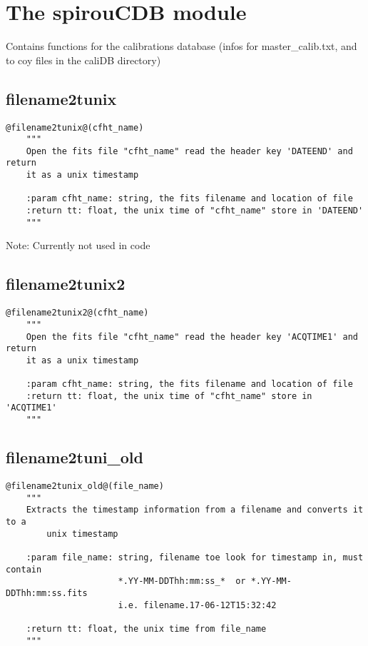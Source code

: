\clearpage
\newpage
\section{The spirouCDB module}

Contains functions for the calibrations database (infos for master\_calib.txt, and to coy files in the caliDB directory)

\subsection{filename2tunix}
\begin{lstlisting}[style=pythonstyle]
@filename2tunix@(cfht_name)
    """
    Open the fits file "cfht_name" read the header key 'DATEEND' and return
    it as a unix timestamp
    
    :param cfht_name: string, the fits filename and location of file
    :return tt: float, the unix time of "cfht_name" store in 'DATEEND' 
    """
\end{lstlisting}

\noindent Note: Currently not used in code \\

\subsection{filename2tunix2}
\begin{lstlisting}[style=pythonstyle]
@filename2tunix2@(cfht_name)
    """
    Open the fits file "cfht_name" read the header key 'ACQTIME1' and return
    it as a unix timestamp

    :param cfht_name: string, the fits filename and location of file
    :return tt: float, the unix time of "cfht_name" store in 'ACQTIME1'
    """
\end{lstlisting}

\vspace{0.5cm}
\subsection{filename2tuni\_old}
\begin{lstlisting}[style=pythonstyle]
@filename2tunix_old@(file_name)
    """
    Extracts the timestamp information from a filename and converts it to a 
        unix timestamp

    :param file_name: string, filename toe look for timestamp in, must contain
                      *.YY-MM-DDThh:mm:ss_*  or *.YY-MM-DDThh:mm:ss.fits
                      i.e. filename.17-06-12T15:32:42
                      
    :return tt: float, the unix time from file_name
    """
\end{lstlisting}

